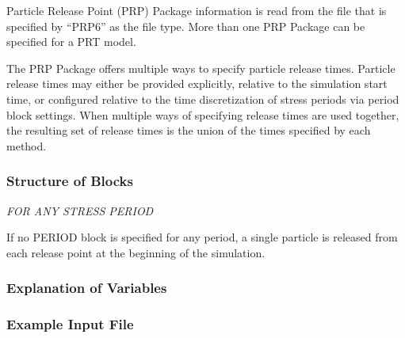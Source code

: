 Particle Release Point (PRP) Package information is read from the file that is specified by ``PRP6'' as the file type.  More than one PRP Package can be specified for a PRT model. 

The PRP Package offers multiple ways to specify particle release times.  Particle release times may either be provided explicitly, relative to the simulation start time, or configured relative to the time discretization of stress periods via period block settings.  When multiple ways of specifying release times are used together, the resulting set of release times is the union of the times specified by each method.

\vspace{5mm}
\subsubsection{Structure of Blocks}



\vspace{5mm}
\noindent \textit{FOR ANY STRESS PERIOD}

\packageperioddescription \: If no PERIOD block is specified for any period, a single particle is released from each release point at the beginning of the simulation.

\vspace{5mm}
\subsubsection{Explanation of Variables}
\begin{description}

\end{description}

\vspace{5mm}
\subsubsection{Example Input File}


